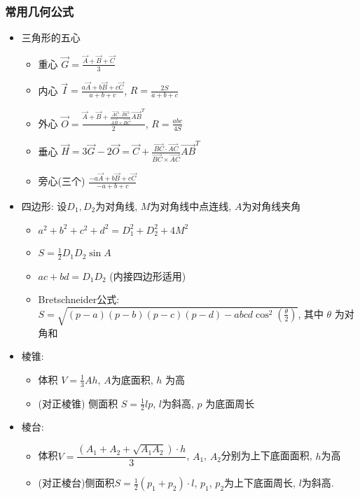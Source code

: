\documentclass[landscape, twocolumn, 8pt, a4paper, twoside]{extarticle}
\begin{document}
    \subsubsection{常用几何公式}
    \begin{itemize}
    \item 三角形的五心
      \begin{itemize}
      \item 重心 $\overrightarrow{G} = \frac{\overrightarrow{A} + \overrightarrow{B} + \overrightarrow{C}}{3}$
      \item
        内心 $\overrightarrow{I} = \frac{a\overrightarrow{A} + b\overrightarrow{B} + c\overrightarrow{C}}{a + b + c}$,
        $R = \frac{2S}{a + b + c}$
      \item
        外心 $\overrightarrow{O} = \frac{\overrightarrow{A} + \overrightarrow{B} + \frac{\overrightarrow{AC} \cdot \overrightarrow{BC}}{\overrightarrow{AB} \times \overrightarrow{BC}} \overrightarrow{AB}^{T}}{2}$,
        $R = \frac{abc}{4S}$
      \item
        垂心 $\overrightarrow{H} = 3\overrightarrow{G} - 2\overrightarrow{O} = \overrightarrow{C} + \frac{\overrightarrow{BC} \cdot \overrightarrow{AC}}{\overrightarrow{BC} \times \overrightarrow{AC}} \overrightarrow{AB} ^ {T}$
      \item
        旁心(三个) $\frac{-a\overrightarrow{A} + b\overrightarrow{B} + c\overrightarrow{C}}{-a + b + c}$
      \end{itemize}

    \item 四边形: 设$D_1, D_2$为对角线, $M$为对角线中点连线, $A$为对角线夹角
      \begin{itemize}
      \item $a^2 + b^2 + c^2 + d^2 = D_1^2 + D_2 ^ 2 + 4 M^2$
      \item $S = \frac{1}{2} D_1  D_2 \sin A$
      \item $ac + bd = D_1 D_2$ (内接四边形适用)
      \item Bretschneider公式:
        $S = \sqrt{(p - a)(p - b)(p - c)(p - d) - abcd \cos^2(\frac{\theta}{2})}$, 其中 $\theta$ 为对角和
      \end{itemize}
    \item 棱锥:
      \begin{itemize}
      \item 体积 $V = \frac{1}{3}Ah$, $A$为底面积, $h$ 为高
      \item (对正棱锥) 侧面积 $S = \frac{1}{2} lp $, $l$为斜高, $p$ 为底面周长
      \end{itemize}
    \item 棱台:
      \begin{itemize}
      \item 体积$V = \dfrac{(A_1 + A_2 + \sqrt{A_1 A_2}) \cdot h}{3}$, $A_1$, $A_2$分别为上下底面面积, $h$为高
      \item (对正棱台)侧面积$S = \frac{1}{2} (p_1 + p_2) \cdot l$, $p_1$, $p_2$为上下底面周长, $l$为斜高. 
      \end{itemize}
    \end{itemize}
\end{document}
